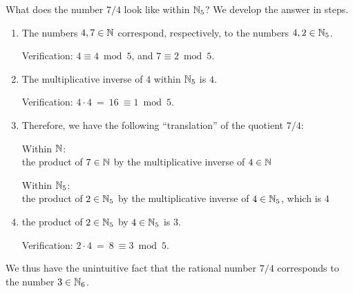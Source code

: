 What does the number $7/4$ look like within $\mathbb{N}_5$?  We develop the answer in steps.

\medskip

\noindent {}

\medskip

\begin{enumerate}
\item
The numbers $4, 7 \in \mathbb{N}$ correspond, respectively, to the numbers $4, 2 \in \mathbb{N}_5$.

\smallskip

Verification:
$4 \equiv 4 \bmod 5$, and $7 \equiv 2 \bmod 5$.

\item
The multiplicative inverse of $4$ within $\mathbb{N}_5$ is $4$.

\smallskip

Verification:
$4 \cdot 4 \ = \ 16 \ \equiv 1 \bmod 5$.

\item
Therefore, we have the following ``translation'' of the quotient $7/4$:

\smallskip

Within $\mathbb{N}$: \\
the product of $7 \in \mathbb{N}$ by the multiplicative inverse of $4 \in \mathbb{N}$

\smallskip

Within $\mathbb{N}_5$: \\
the product of $2 \in \mathbb{N}_5$ by the multiplicative inverse of $4 \in
\mathbb{N}_5$, which is $4$

\item
the product of $2 \in \mathbb{N}_5$ by $4 \in \mathbb{N}_5$ is $3$.

\smallskip

Verification:
$2 \cdot 4 \ = \ 8 \ \equiv 3 \bmod 5$.
\end{enumerate}
We thus have the unintuitive fact that the rational number $7/4$ corresponds to the number $3 \in \mathbb{N}_6$.

